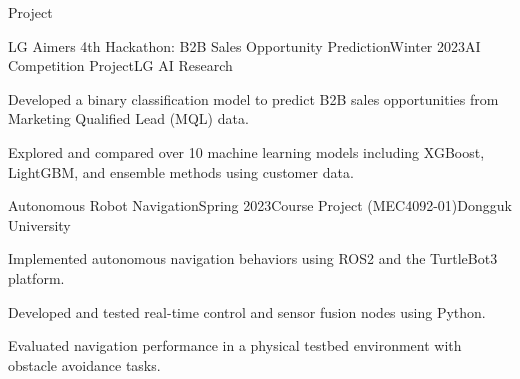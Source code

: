 \begin{rSection}{Project}

  \begin{rSubsection}{LG Aimers 4th Hackathon: B2B Sales Opportunity Prediction}{Winter 2023}{AI Competition Project}{LG AI Research}
    \item Developed a binary classification model to predict B2B sales opportunities from Marketing Qualified Lead (MQL) data.
    \item Explored and compared over 10 machine learning models including XGBoost, LightGBM, and ensemble methods using customer data.
  \end{rSubsection}
  
  \begin{rSubsection}{Autonomous Robot Navigation}{Spring 2023}{Course Project (MEC4092-01)}{Dongguk University}
    \item Implemented autonomous navigation behaviors using ROS2 and the TurtleBot3 platform.
    \item Developed and tested real-time control and sensor fusion nodes using Python.
    \item Evaluated navigation performance in a physical testbed environment with obstacle avoidance tasks.
  \end{rSubsection}
  

\end{rSection}
